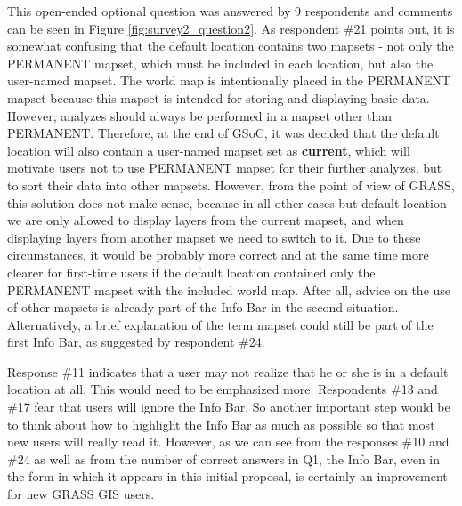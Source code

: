 \documentclass[a4paper,10pt,twoside]{article}
\begin{document}
\noindent This open-ended optional question was answered by 9
respondents and comments can be seen in Figure
\ref{fig:survey2_question2}. As respondent \#21 points out, it is
somewhat confusing that the default location contains two mapsets -
not only the PERMANENT mapset, which must be included in each
location, but also the user-named mapset. The world map is
intentionally placed in the PERMANENT mapset because this mapset is
intended for storing and displaying basic data. However, analyzes
should always be performed in a mapset other than
PERMANENT. Therefore, at the end of GSoC, it was decided that the
default location will also contain a user-named mapset set as
\textbf{current}, which will motivate users not to use PERMANENT
mapset for their further analyzes, but to sort their data into other
mapsets. However, from the point of view of GRASS, this solution does
not make sense, because in all other cases but default location we are
only allowed to display layers from the current mapset, and when
displaying layers from another mapset we need to switch to it. Due to
these circumstances, it would be probably more correct and at the same
time more clearer for first-time users if the default location
contained only the PERMANENT mapset with the included world map. After
all, advice on the use of other mapsets is already part of the Info
Bar in the second situation. Alternatively, a brief explanation of the
term mapset could still be part of the first Info Bar, as suggested by
respondent \#24.

Response \#11 indicates that a user may not realize that he or she is
in a default location at all. This would need to be emphasized
more. Respondents \#13 and \#17 fear that users will ignore the Info
Bar. So another important step would be to think about how to
highlight the Info Bar as much as possible so that most new users will
really read it. However, as we can see from the responses \#10 and
\#24 as well as from the number of correct answers in Q1, the Info
Bar, even in the form in which it appears in this initial proposal, is
certainly an improvement for new GRASS GIS users.
\end{document}
